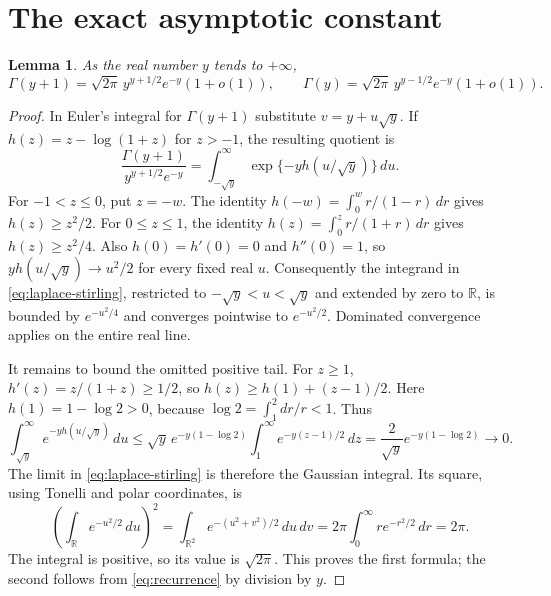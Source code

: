 \documentclass[11pt]{article}
\newtheorem{lemma}[theorem]{Lemma}
\newcommand{\R}{\mathbb R}
\begin{document}
\section{The exact asymptotic constant}\label{sec:stirling}
\begin{lemma}\label{lem:stirling}
As the real number $y$ tends to $+\infty$,
\begin{equation}\label{eq:stirling}
\Gamma(y+1)=\sqrt{2\pi}\,y^{y+1/2}e^{-y}(1+o(1)),
\qquad
\Gamma(y)=\sqrt{2\pi}\,y^{y-1/2}e^{-y}(1+o(1)).
\end{equation}
\end{lemma}
\begin{proof}
In Euler's integral for $\Gamma(y+1)$ substitute $v=y+u\sqrt y$.
If $h(z)=z-\log(1+z)$ for $z>-1$, the resulting quotient is
\begin{equation}\label{eq:laplace-stirling}
\frac{\Gamma(y+1)}{y^{y+1/2}e^{-y}}
=\int_{-\sqrt y}^{\infty}\exp\{-y h(u/\sqrt y)\}\,du.
\end{equation}
For $-1<z\le0$, put $z=-w$. The identity
$h(-w)=\int_0^w r/(1-r)\,dr$ gives $h(z)\ge z^2/2$.
For $0\le z\le1$, the identity
$h(z)=\int_0^z r/(1+r)\,dr$ gives $h(z)\ge z^2/4$.
Also $h(0)=h'(0)=0$ and $h''(0)=1$, so
$y h(u/\sqrt y)\to u^2/2$ for every fixed real $u$.
Consequently the integrand in \eqref{eq:laplace-stirling}, restricted
to $-\sqrt y<u<\sqrt y$ and extended by zero to $\R$, is bounded
by $e^{-u^2/4}$ and converges pointwise to $e^{-u^2/2}$.
Dominated convergence applies on the entire real line.

It remains to bound the omitted positive tail. For $z\ge1$,
$h'(z)=z/(1+z)\ge1/2$, so
$h(z)\ge h(1)+(z-1)/2$. Here $h(1)=1-\log2>0$, because
$\log2=\int_1^2 dr/r<1$. Thus
\begin{equation}\label{eq:stirling-tail}
\int_{\sqrt y}^{\infty}e^{-y h(u/\sqrt y)}\,du
\le \sqrt y\,e^{-y(1-\log2)}
\int_1^{\infty}e^{-y(z-1)/2}\,dz
=\frac2{\sqrt y}e^{-y(1-\log2)}\longrightarrow0.
\end{equation}
The limit in \eqref{eq:laplace-stirling} is therefore the Gaussian
integral. Its square, using Tonelli and polar coordinates, is
\[
\left(\int_{\R}e^{-u^2/2}\,du\right)^2
=\int_{\R^2}e^{-(u^2+v^2)/2}\,du\,dv
=2\pi\int_0^\infty r e^{-r^2/2}\,dr=2\pi.
\]
The integral is positive, so its value is $\sqrt{2\pi}$.
This proves the first formula; the second follows from
\eqref{eq:recurrence} by division by $y$.
\end{proof}
\end{document}
